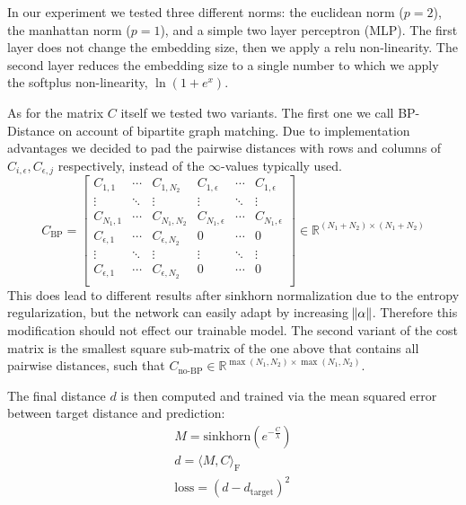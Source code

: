 In our experiment we tested three different norms: the euclidean norm ($p=2$), the manhattan norm ($p=1$), and a simple two layer perceptron (MLP). The first layer does not change the embedding size, then we apply a relu non-linearity. The second layer reduces the embedding size to a single number to which we apply the softplus non-linearity, $\ln(1 + e^x)$.

As for the matrix $C$ itself we tested two variants. The first one we call BP-Distance on account of bipartite graph matching. Due to implementation advantages we decided to pad the pairwise distances with rows and columns of $C_{i, \epsilon}, C_{\epsilon, j}$ respectively, instead of the $\infty$-values typically used.
\begin{equation}
     C_\text{BP}=
          \left[
          \begin{array}{ccc|ccc}
               C_{1,1} & \dotsi & C_{1, N_2} & C_{1, \epsilon} & \dotsi & C_{1, \epsilon} \\
               \vdots & \ddots & \vdots & \vdots & \ddots & \vdots \\
               C_{N_1, 1} & \dotsi & C_{N_1, N_2} & C_{N_1, \epsilon} & \dotsi & C_{N_1, \epsilon} \\
               \hline
               C_{\epsilon, 1} & \dotsi & C_{\epsilon, N_2} & 0 & \dotsi & 0 \\
               \vdots & \ddots & \vdots & \vdots & \ddots & \vdots \\
               C_{\epsilon, 1} & \dotsi & C_{\epsilon, N_2} & 0 & \dotsi & 0 \\
          \end{array}
          \right]
     \in \mathbb{R}^{(N_1 + N_2) \times (N_1 + N_2)}
\end{equation}
This does lead to different results after sinkhorn normalization due to the entropy regularization, but the network can easily adapt by increasing $\norm{\alpha}$. Therefore this modification should not effect our trainable model. The second variant of the cost matrix is the smallest square sub-matrix of the one above that contains all pairwise distances, such that \mbox{$C_\text{no-BP} \in \mathbb{R}^{\max({N_1, N_2}) \times \max({N_1, N_2})}$}.

The final distance $d$ is then computed and trained via the mean squared error between target distance and prediction:
\begin{equation}
     \begin{gathered}
          M = \text{sinkhorn}(e^{-\frac{C}{\lambda}}) \\
          d = \langle M, C \rangle_\mathrm{F} \\
          \text{loss} = (d - d_\text{target})^2
     \end{gathered}
\end{equation}


